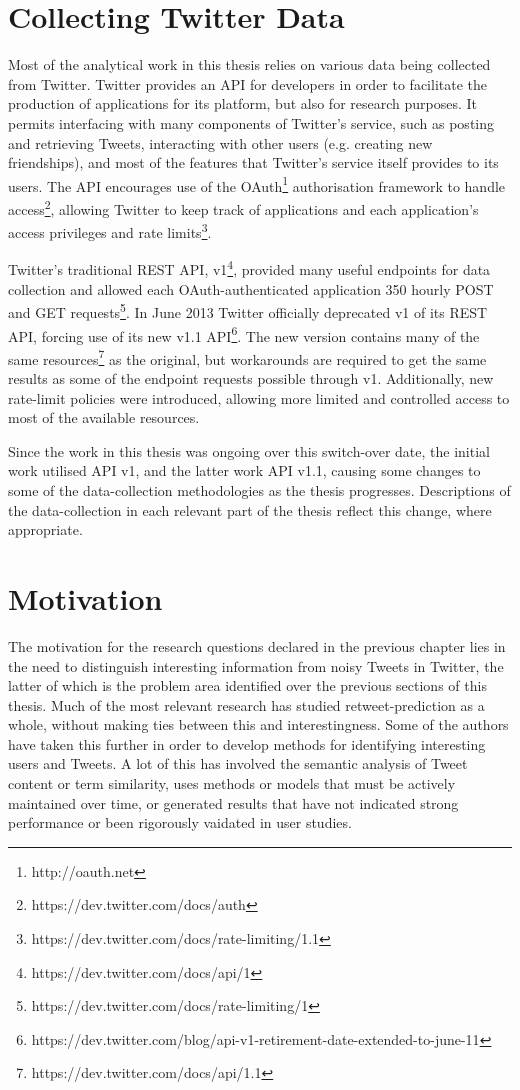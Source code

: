 \section{Collecting Twitter Data}
Most of the analytical work in this thesis relies on various data being collected from Twitter. Twitter provides an API for developers in order to facilitate the production of applications for its platform, but also for research purposes. It permits interfacing with many components of Twitter's service, such as posting and retrieving Tweets, interacting with other users (e.g. creating new friendships), and most of the features that Twitter's service itself provides to its users. The API encourages use of the OAuth\footnote{http://oauth.net} authorisation framework to handle access\footnote{https://dev.twitter.com/docs/auth}, allowing Twitter to keep track of applications and each application's access privileges and rate limits\footnote{https://dev.twitter.com/docs/rate-limiting/1.1}.

Twitter's traditional REST API, v1\footnote{https://dev.twitter.com/docs/api/1}, provided many useful endpoints for data collection and allowed each OAuth-authenticated application 350 hourly POST and GET requests\footnote{https://dev.twitter.com/docs/rate-limiting/1}. In June 2013 Twitter officially deprecated v1 of its REST API, forcing use of its new v1.1 API\footnote{https://dev.twitter.com/blog/api-v1-retirement-date-extended-to-june-11}. The new version contains many of the same resources\footnote{https://dev.twitter.com/docs/api/1.1} as the original, but workarounds are required to get the same results as some of the endpoint requests possible through v1. Additionally, new rate-limit policies were introduced, allowing more limited and controlled access to most of the available resources.

Since the work in this thesis was ongoing over this switch-over date, the initial work utilised API v1, and the latter work API v1.1, causing some changes to some of the data-collection methodologies as the thesis progresses. Descriptions of the data-collection in each relevant part of the thesis reflect this change, where appropriate.


\section{Motivation}
The motivation for the research questions declared in the previous chapter lies in the need to distinguish interesting information from noisy Tweets in Twitter, the latter of which is the problem area identified over the previous sections of this thesis. Much of the most relevant research has studied retweet-prediction as a whole, without making ties between this and interestingness. Some of the authors have taken this further in order to develop methods for identifying interesting users and Tweets. A lot of this has involved the semantic analysis of Tweet content or term similarity, uses methods or models that must be actively maintained over time, or generated results that have not indicated strong performance or been rigorously vaidated in user studies.

